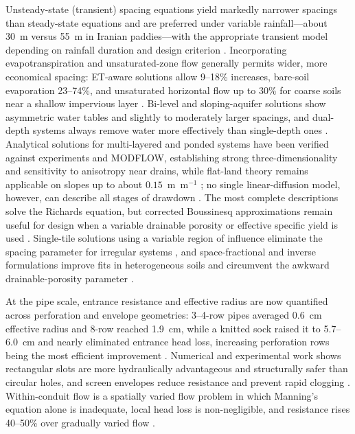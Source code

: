 \documentclass[11pt]{article}
\begin{document}
Unsteady-state (transient) spacing equations yield markedly narrower spacings
than steady-state equations and are preferred under variable rainfall---about
30~m versus 55~m in Iranian paddies---with the appropriate transient model
depending on rainfall duration and design criterion
\parencite{OOSTERBAAN1988,DarziNaftchally2014,Moshayedi2020,Pali2014,Nédélec2010}.
Incorporating evapotranspiration and unsaturated-zone flow generally permits
wider, more economical spacing: ET-aware solutions allow 9--18\% increases,
bare-soil evaporation 23--74\%, and unsaturated horizontal flow up to 30\% for
coarse soils near a shallow impervious layer
\parencite{NIKAM1992,Singh2010,Upadhyaya2000,AbdelFattah2005,Yousfi2014}.
Bi-level and sloping-aquifer solutions show asymmetric water tables and
slightly to moderately larger spacings, and dual-depth systems always remove
water more effectively than single-depth ones
\parencite{Verma1998,Kankarej2023,Upadhyaya2013,Hartani2001,Kirkham1997}.
Analytical solutions for multi-layered and ponded systems have been verified
against experiments and MODFLOW, establishing strong three-dimensionality and
sensitivity to anisotropy near drains, while flat-land theory remains
applicable on slopes up to about $0.15$~m~m$^{-1}$
\parencite{Chakrabarti2020,Sarmah2015,SHARMA1991,Afruzi2014,Lin2025,CHU1977,FIPPS1989,LORRE1994};
no single linear-diffusion model, however, can describe all stages of drawdown
\parencite{Kacimov2000}. The most complete descriptions solve the Richards
equation, but corrected Boussinesq approximations remain useful for design when
a variable drainable porosity or effective specific yield is used
\parencite{TANG1977,Xin2016c,VANDELEUR1959,SINGH1980,Bouarfa2000}. Single-tile
solutions using a variable region of influence eliminate the spacing parameter
for irregular systems \parencite{Cooke2001}, and space-fractional and inverse
formulations improve fits in heterogeneous soils and circumvent the awkward
drainable-porosity parameter
\parencite{FathAllah2025,Mehdinejadiani2013,Mehdinejadiani2020,Mehdinejadiani2022,Samani2007,Chahar2010,SINGH1992,KUMAR1994,Onyejekwe1999,Bahceci2008}.

At the pipe scale, entrance resistance and effective radius are now quantified
across perforation and envelope geometries: 3--4-row pipes averaged 0.6~cm
effective radius and 8-row reached 1.9~cm, while a knitted sock raised it to
5.7--6.0~cm and nearly eliminated entrance head loss, increasing perforation
rows being the most efficient improvement
\parencite{Ghane2022b,Ghane2022}. Numerical and experimental work shows
rectangular slots are more hydraulically advantageous and structurally safer
than circular holes, and screen envelopes reduce resistance and prevent rapid
clogging
\parencite{Gaj2020,Oyarce2017,Gaj2021,Stuyt2006}. Within-conduit flow is a
spatially varied flow problem in which Manning's equation alone is inadequate,
local head loss is non-negligible, and resistance rises 40--50\% over
gradually varied flow
\parencite{Bayat2011,Graber2004,Kouchakzadeh2011,Nédélec2008,Wu2022,Gupta2019}.
\end{document}

